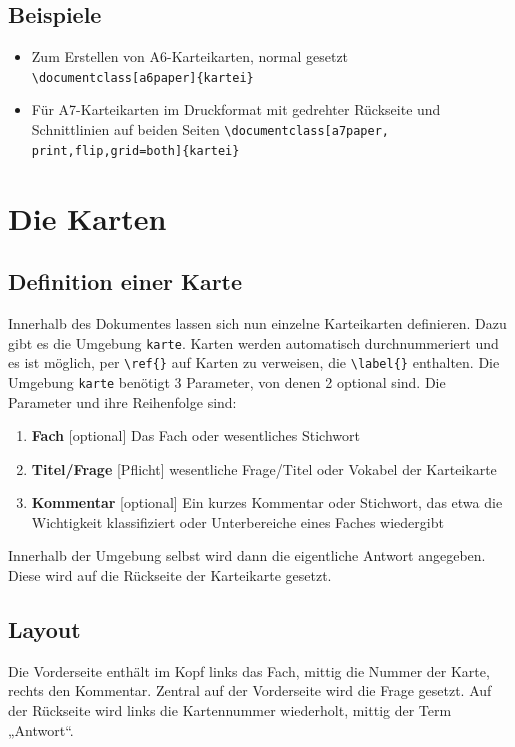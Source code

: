 \documentclass[a4paper,DIV=calc]{scrartcl}
\begin{document}
\subsection{Beispiele}
\begin{itemize}
	\item Zum Erstellen von A6-Karteikarten, normal gesetzt \lstinline!\documentclass[a6paper]{kartei}!
	\item Für A7-Karteikarten im Druckformat mit gedrehter Rückseite und Schnittlinien auf beiden Seiten \lstinline!\documentclass[a7paper, print,flip,grid=both]{kartei}!
\end{itemize}
%
%
%
\section{Die Karten}

\subsection{Definition einer Karte}

Innerhalb des Dokumentes lassen sich nun einzelne Karteikarten definieren. Dazu gibt es die Umgebung \lstinline!karte!. Karten werden automatisch durchnummeriert und es ist möglich, per \lstinline!\ref{}! auf Karten zu verweisen, die \lstinline!\label{}! enthalten.
Die Umgebung \lstinline!karte! benötigt 3 Parameter, von denen 2 optional sind. Die Parameter und ihre Reihenfolge sind:
\begin{enumerate}[1.]
	\item \textbf{Fach} [optional] Das Fach oder wesentliches Stichwort
	\item \textbf{Titel/Frage} [Pflicht] wesentliche Frage/Titel oder Vokabel der Karteikarte
	\item \textbf{Kommentar} [optional] Ein kurzes Kommentar oder Stichwort, das etwa die Wichtigkeit klassifiziert oder Unterbereiche eines Faches wiedergibt
\end{enumerate}
Innerhalb der Umgebung selbst wird dann die eigentliche Antwort angegeben. Diese wird auf die Rückseite der Karteikarte gesetzt.

\subsection{Layout}
Die Vorderseite enthält im Kopf links das Fach, mittig die Nummer der Karte, rechts den Kommentar. Zentral auf der Vorderseite wird die Frage gesetzt. Auf der Rückseite wird links die Kartennummer wiederholt, mittig der Term „Antwort“.
\end{document}
